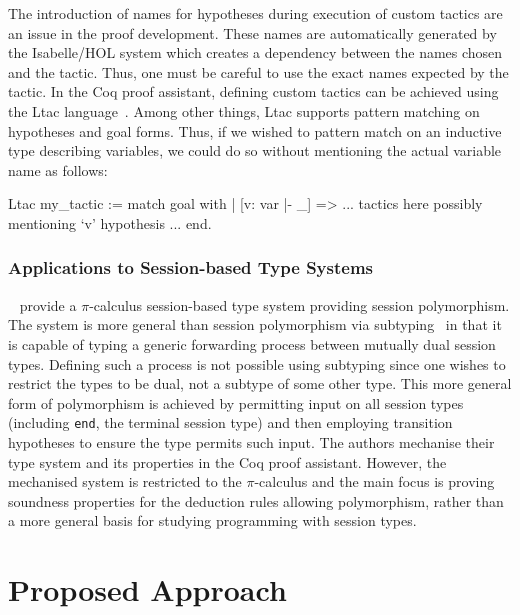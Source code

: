 \documentclass{mprop}
\newcommand{\1}{\textbf{1}\xspace}
\begin{document}
The introduction of names for hypotheses during execution of custom tactics
are an issue in the proof development. These names are automatically generated
by the Isabelle/HOL system which creates a dependency between the names chosen
and the tactic. Thus, one must be careful to use the exact names expected by
the tactic. In the Coq proof assistant, defining custom tactics can be
achieved using the Ltac language~\cite{Delahaye:2000:TLS}. Among other things,
Ltac supports pattern matching on hypotheses and goal forms. Thus, if we
wished to pattern match on an inductive type describing variables, we could do
so without mentioning the actual variable name as follows:

\begin{coq}
Ltac my_tactic :=
  match goal with
  | [v: var |- _] => ... tactics here possibly mentioning `v' hypothesis ...
  end.
\end{coq}

\subsubsection{Applications to Session-based Type Systems}\label{sec:asts}

\citeauthor{Goto:2014}~\cite{Goto:2014} provide a $\pi$-calculus session-based
type system providing session polymorphism. The system is more general than
session polymorphism via subtyping~\cite{Gay:2005:SST} in that it is capable
of typing a generic forwarding process between mutually dual session
types. Defining such a process is not possible using subtyping since one
wishes to restrict the types to be dual, not a subtype of some other
type. This more general form of polymorphism is achieved by permitting input
on all session types (including \lstinline{end}, the terminal session type)
and then employing transition hypotheses to ensure the type permits such
input. The authors mechanise their type system and its properties in the Coq
proof assistant. However, the mechanised system is restricted to the
$\pi$-calculus and the main focus is proving soundness properties for the
deduction rules allowing polymorphism, rather than a more general basis for
studying programming with session types.

\section{Proposed Approach}\label{sec:approach}
\end{document}

